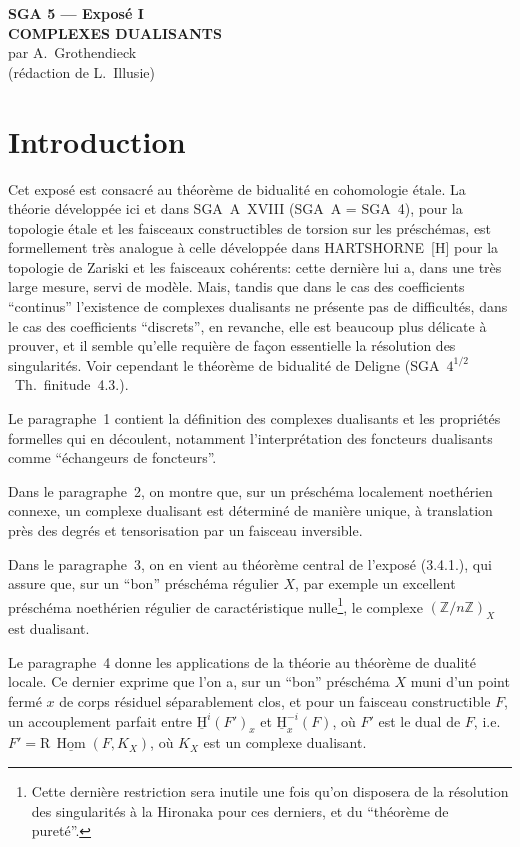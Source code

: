 \documentclass[11pt]{article}
\renewcommand{\H}{\mathrm{H}}
\DeclareMathOperator{\Hom}{Hom}
\newcommand{\R}{\mathrm{R}}\newcommand{\RHomCore}{\mathrm{RHom}}
\newcommand{\Z}{\mathbb{Z}}
\providecommand{\Hom}{\operatorname{Hom}}
\providecommand{\R}{\mathrm R}
\providecommand{\Z}{\mathbb Z}
\providecommand{\Hom}{\operatorname{Hom}}
\begin{document}
\begin{center}
{\Large \textbf{SGA 5 --- Exposé I}}\\[0.4em]
{\large \textbf{COMPLEXES DUALISANTS}}\\[0.3em]
par A.~Grothendieck\\
(rédaction de L.~Illusie)
\end{center}

\section*{Introduction}

Cet exposé est consacré au théorème de bidualité en cohomologie étale. La théorie développée ici et dans SGA~A~XVIII (SGA~A = SGA~4), pour la topologie étale et les faisceaux constructibles de torsion sur les préschémas, est formellement très analogue à celle développée dans HARTSHORNE~[H] pour la topologie de Zariski et les faisceaux cohérents: cette dernière lui a, dans une très large mesure, servi de modèle. Mais, tandis que dans le cas des coefficients ``continus'' l'existence de complexes dualisants ne présente pas de difficultés, dans le cas des coefficients ``discrets'', en revanche, elle est beaucoup plus délicate à prouver, et il semble qu'elle requière de façon essentielle la résolution des singularités. Voir cependant le théorème de bidualité de Deligne (SGA~$4^{1/2}$~Th.~finitude~4.3.).

Le paragraphe~1 contient la définition des complexes dualisants et les propriétés formelles qui en découlent, notamment l'interprétation des foncteurs dualisants comme ``échangeurs de foncteurs''.

Dans le paragraphe~2, on montre que, sur un préschéma localement noethérien connexe, un complexe dualisant est déterminé de manière unique, à translation près des degrés et tensorisation par un faisceau inversible.

Dans le paragraphe~3, on en vient au théorème central de l'exposé (3.4.1.), qui assure que, sur un ``bon'' préschéma régulier $X$, par exemple un excellent préschéma noethérien régulier de caractéristique nulle\footnote{Cette dernière restriction sera inutile une fois qu'on disposera de la résolution des singularités à la Hironaka pour ces derniers, et du ``théorème de pureté''.}, le complexe $(\Z/n\Z)_X$ est dualisant.

Le paragraphe~4 donne les applications de la théorie au théorème de dualité locale. Ce dernier exprime que l'on a, sur un ``bon'' préschéma $X$ muni d'un point fermé $x$ de corps résiduel séparablement clos, et pour un faisceau constructible $F$, un accouplement parfait entre $\underline{\H}^i(F')_x$ et $\underline{\H}^{-i}_x(F)$, où $F'$ est le dual de $F$, i.e.\ $F' = \R\,\underline{\Hom}(F,K_X)$, où $K_X$ est un complexe dualisant.
\end{document}
